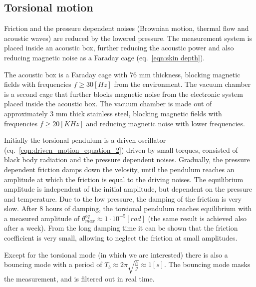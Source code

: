 \documentclass[\main/master.tex]{subfiles}
\begin{document}
\subsection{Torsional motion}
Friction and the pressure dependent noises (Brownian motion, thermal flow and acoustic waves) are reduced by the lowered pressure. The measurement system is placed inside an acoustic box, further reducing the acoustic power and also reducing magnetic noise as a Faraday cage (eq.~\ref{eqn:skin depth}). 
\par\noindent
The acoustic box is a Faraday cage with 76 mm thickness, blocking magnetic fields with frequencies $f \ge 30 [Hz]$ from the environment. The vacuum chamber is a second cage that further blocks magnetic noise from the electronic system placed inside the acoustic box. The vacuum chamber is made out of approximately 3 mm thick stainless steel, blocking magnetic fields with frequencies $f\ge 20 [KHz]$ and reducing magnetic noise with lower frequencies.
\par\noindent
Initially the torsional pendulum is a driven oscillator (eq.~\ref{eqn:driven_motion_equation_2}) driven by small torques, consisted of black body radiation and the pressure dependent noises. Gradually, the pressure dependent friction damps down the velosity, until the pendulum reaches an amplitude at which the friction is equal to the driving noises. The equilibrium amplitude is independent of the initial amplitude, but dependent on the pressure and temperature. Due to the low pressure, the damping of the friction is very slow. After 8 hours of damping, the torsional pendulum reaches equilibrium with a measured amplitude of $\theta_{max}^{eq}\approx 1\cdot10^{-5}[rad]$ (the same result is achieved also after a week). From the long damping time it can be shown that the friction coefficient is very small, allowing to neglect the friction at small amplitudes.
\par\noindent
Except for the torsional mode (in which we are interested) there is also a bouncing mode with a period of $T_b\approx 2\pi\sqrt{\frac{h}{g}}\approx 1[s]$. The bouncing mode masks the measurement, and is filtered out in real time.  
\par\noindent
\end{document}
